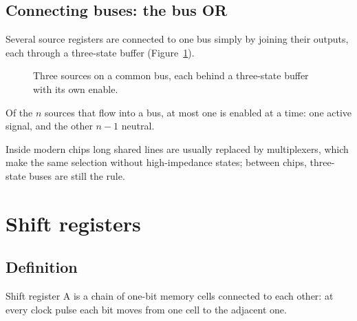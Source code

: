 \subsection{Connecting buses: the bus OR}

Several source registers are connected to one bus simply by joining their
outputs, each through a three-state buffer (Figure~\ref{fig:rb:busor}).

\begin{figure}[htb]
\centering
{}
\caption{Three sources on a common bus, each behind a three-state buffer with
its own enable.}
\label{fig:rb:busor}
\end{figure}

\begin{prgconcept}
Of the $n$ sources that flow into a bus, at most one is enabled at a time: one
active signal, and the other $n-1$ neutral.
\end{prgconcept}

Inside modern chips long shared lines are usually replaced by multiplexers,
which make the same selection without high-impedance states; between chips,
three-state buses are still the rule.

\section{Shift registers}

\subsection{Definition}

\begin{definition}{Shift register}
A  is a chain of one-bit memory cells connected to each
other: at every clock pulse each bit moves from one cell to the adjacent one.
\end{definition}

